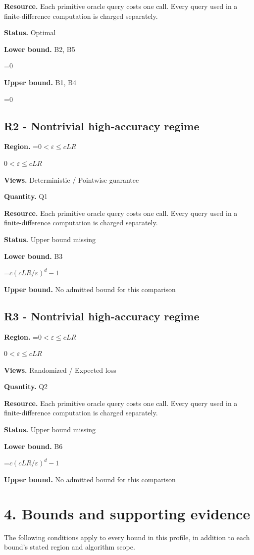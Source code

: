 \documentclass[10pt,a4paper]{article}
\newcommand{\AtlasMath}[1]{\par\begingroup\centering\setbox0=\hbox{$\displaystyle #1$}\ifdim\wd0>1.4\linewidth\typeout{ATLAS WIDE FORMULA: \the\wd0}\fi\ifdim\wd0>\linewidth\resizebox{\linewidth}{!}{\box0}\else\box0\fi\par\endgroup}
\newcommand{\AtlasInlineMath}[1]{\begingroup\setbox0=\hbox{$#1$}\ifdim\wd0>.4\linewidth\endgroup\AtlasMath{#1}\else\endgroup$#1$\fi}
\begin{document}
\textbf{Resource.} Each primitive oracle query costs one call. Every query used in a finite-difference computation is charged separately.

\textbf{Status.} Optimal

\textbf{Lower bound.} B2, B5

\AtlasMath{0}
\textbf{Upper bound.} B1, B4

\AtlasMath{0}
\subsection{R2 - Nontrivial high-accuracy regime}
\textbf{Region.} \AtlasInlineMath{0<\varepsilon\le cLR}

\textbf{Views.} Deterministic / Pointwise guarantee

\textbf{Quantity.} Q1

\textbf{Resource.} Each primitive oracle query costs one call. Every query used in a finite-difference computation is charged separately.

\textbf{Status.} Upper bound missing

\textbf{Lower bound.} B3

\AtlasMath{c(cLR/\varepsilon)^d-1}
\textbf{Upper bound.} No admitted bound for this comparison

\subsection{R3 - Nontrivial high-accuracy regime}
\textbf{Region.} \AtlasInlineMath{0<\varepsilon\le cLR}

\textbf{Views.} Randomized / Expected loss

\textbf{Quantity.} Q2

\textbf{Resource.} Each primitive oracle query costs one call. Every query used in a finite-difference computation is charged separately.

\textbf{Status.} Upper bound missing

\textbf{Lower bound.} B6

\AtlasMath{c(cLR/\varepsilon)^d-1}
\textbf{Upper bound.} No admitted bound for this comparison

\section{4. Bounds and supporting evidence}
The following conditions apply to every bound in this profile, in addition to each bound's stated region and algorithm scope.
\end{document}
